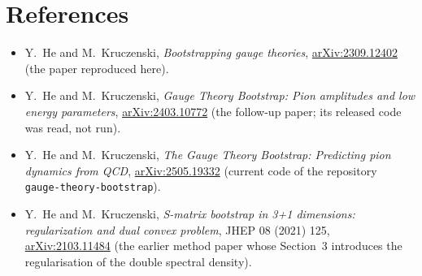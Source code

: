 \documentclass[11pt,a4paper]{article}
\begin{document}
\section*{References}
\begin{itemize}[leftmargin=*,itemsep=2pt]
\item Y.~He and M.~Kruczenski, \emph{Bootstrapping gauge theories}, \href{https://arxiv.org/abs/2309.12402}{arXiv:2309.12402} (the paper reproduced here).
\item Y.~He and M.~Kruczenski, \emph{Gauge Theory Bootstrap: Pion amplitudes and low energy parameters}, \href{https://arxiv.org/abs/2403.10772}{arXiv:2403.10772} (the follow-up paper; its released code was read, not run).
\item Y.~He and M.~Kruczenski, \emph{The Gauge Theory Bootstrap: Predicting pion dynamics from QCD}, \href{https://arxiv.org/abs/2505.19332}{arXiv:2505.19332} (current code of the repository \texttt{gauge-theory-bootstrap}).
\item Y.~He and M.~Kruczenski, \emph{S-matrix bootstrap in 3+1 dimensions: regularization and dual convex problem}, JHEP 08 (2021) 125, \href{https://arxiv.org/abs/2103.11484}{arXiv:2103.11484} (the earlier method paper whose Section~3 introduces the regularisation of the double spectral density).
\end{itemize}
\end{document}
